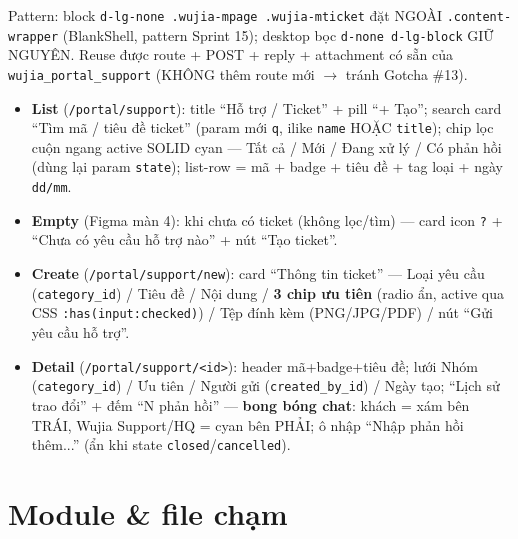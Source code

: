 Pattern: block \texttt{d-lg-none .wujia-mpage .wujia-mticket} đặt NGOÀI
\texttt{.content-wrapper} (BlankShell, pattern Sprint 15); desktop bọc \texttt{d-none
d-lg-block} GIỮ NGUYÊN. Reuse được route + POST + reply + attachment có sẵn của
\texttt{wujia\_portal\_support} (KHÔNG thêm route mới \(\rightarrow\) tránh Gotcha \#13).

\begin{itemize}
  \item \textbf{List} (\texttt{/portal/support}): title ``Hỗ trợ / Ticket'' + pill ``+
        Tạo''; search card ``Tìm mã / tiêu đề ticket'' (param mới \texttt{q}, ilike
        \texttt{name} HOẶC \texttt{title}); chip lọc cuộn ngang active SOLID cyan ---
        Tất cả / Mới / Đang xử lý / Có phản hồi (dùng lại param \texttt{state}); list-row
        = mã + badge + tiêu đề + tag loại + ngày \texttt{dd/mm}.
  \item \textbf{Empty} (Figma màn 4): khi chưa có ticket (không lọc/tìm) --- card icon
        \texttt{?} + ``Chưa có yêu cầu hỗ trợ nào'' + nút ``Tạo ticket''.
  \item \textbf{Create} (\texttt{/portal/support/new}): card ``Thông tin ticket'' --- Loại
        yêu cầu (\texttt{category\_id}) / Tiêu đề / Nội dung / \textbf{3 chip ưu tiên}
        (radio ẩn, active qua CSS \texttt{:has(input:checked)}) / Tệp đính kèm
        (PNG/JPG/PDF) / nút ``Gửi yêu cầu hỗ trợ''.
  \item \textbf{Detail} (\texttt{/portal/support/<id>}): header mã+badge+tiêu đề; lưới
        Nhóm (\texttt{category\_id}) / Ưu tiên / Người gửi (\texttt{created\_by\_id}) /
        Ngày tạo; ``Lịch sử trao đổi'' + đếm ``N phản hồi'' --- \textbf{bong bóng chat}:
        khách = xám bên TRÁI, Wujia Support/HQ = cyan bên PHẢI; ô nhập ``Nhập phản hồi
        thêm...'' (ẩn khi state \texttt{closed}/\texttt{cancelled}).
\end{itemize}

\section{Module \& file chạm}

